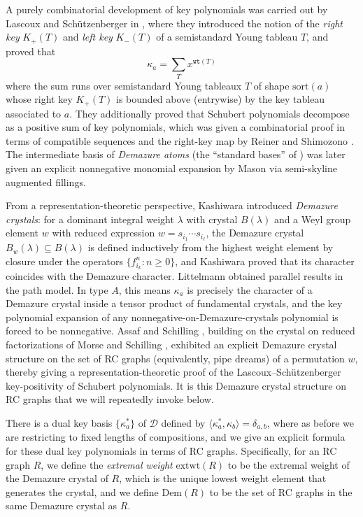 \documentclass{amsart}
\theoremstyle{definition}
\theoremstyle{remark}
\numberwithin{equation}{subsection}
\newcommand{\wtt}{\mathtt{wt}}
\newcommand{\dcoma}{\mathcal{D}}
\begin{document}
A purely combinatorial development of key polynomials was carried out by Lascoux and Schützenberger in \cite{lascoux1990keys}, where they introduced the notion of the \emph{right key} $K_+(T)$ and \emph{left key} $K_-(T)$ of a semistandard Young tableau $T$, and proved that
$$\kappa_a = \sum_{T} x^{\wtt(T)}$$
where the sum runs over semistandard Young tableaux $T$ of shape $\mathrm{sort}(a)$ whose right key $K_+(T)$ is bounded above (entrywise) by the key tableau associated to $a$. They additionally proved that Schubert polynomials decompose as a positive sum of key polynomials, which was given a combinatorial proof in terms of compatible sequences and the right-key map by Reiner and Shimozono \cite{reiner1995key}. The intermediate basis of \emph{Demazure atoms} (the ``standard bases'' of \cite{lascoux1990keys}) was later given an explicit nonnegative monomial expansion by Mason \cite{mason2009explicit} via semi-skyline augmented fillings.

From a representation-theoretic perspective, Kashiwara \cite{kashiwara1993crystal} introduced \emph{Demazure crystals}: for a dominant integral weight $\lambda$ with crystal $B(\lambda)$ and a Weyl group element $w$ with reduced expression $w=s_{i_1}\cdots s_{i_\ell}$, the Demazure crystal $B_w(\lambda)\subseteq B(\lambda)$ is defined inductively from the highest weight element by closure under the operators $\{f_{i_k}^n : n\geq 0\}$, and Kashiwara proved that its character coincides with the Demazure character. Littelmann \cite{littelmann1995crystal} obtained parallel results in the path model. In type $A$, this means $\kappa_a$ is precisely the character of a Demazure crystal inside a tensor product of fundamental crystals, and the key polynomial expansion of any nonnegative-on-Demazure-crystals polynomial is forced to be nonnegative. Assaf and Schilling \cite{assaf2018demazure}, building on the crystal on reduced factorizations of Morse and Schilling \cite{morse2016crystal}, exhibited an explicit Demazure crystal structure on the set of RC graphs (equivalently, pipe dreams) of a permutation $w$, thereby giving a representation-theoretic proof of the Lascoux--Schützenberger key-positivity of Schubert polynomials. It is this Demazure crystal structure on RC graphs that we will repeatedly invoke below.

There is a dual key basis $\{\kappa_a^*\}$ of $\dcoma$ defined by $\langle \kappa_a^*, \kappa_b\rangle = \delta_{a,b}$, where as before we are restricting to fixed lengths of compositions, and we give an explicit formula for these dual key polynomials in terms of RC graphs. Specifically, for an RC graph $R$, we define the \emph{extremal weight} $\mathrm{extwt}(R)$ to be the extremal weight of the Demazure crystal of $R$, which is the unique lowest weight element that generates the crystal, and we define $\mathrm{Dem}(R)$ to be the set of RC graphs in the same Demazure crystal as $R$.
\end{document}
